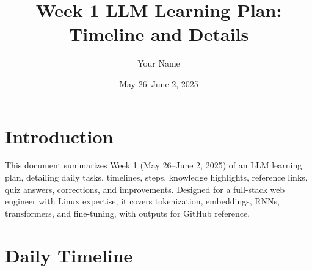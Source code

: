\documentclass[a4paper,12pt]{article}
\title{Week 1 LLM Learning Plan: Timeline and Details}
\author{Your Name}
\date{May 26--June 2, 2025}
\begin{document}
\maketitle

\section*{Introduction}
This document summarizes Week 1 (May 26--June 2, 2025) of an LLM learning plan, detailing daily tasks, timelines, steps, knowledge highlights, reference links, quiz answers, corrections, and improvements. Designed for a full-stack web engineer with Linux expertise, it covers tokenization, embeddings, RNNs, transformers, and fine-tuning, with outputs for GitHub reference.

\section*{Daily Timeline}

\end{document}
